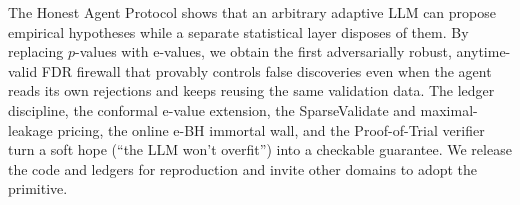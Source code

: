 \documentclass[sigconf]{acmart}
\theoremstyle{plain}
\begin{document}
The Honest Agent Protocol shows that an arbitrary adaptive LLM can propose
empirical hypotheses while a separate statistical layer disposes of them. By
replacing $p$-values with e-values, we obtain the first adversarially robust,
anytime-valid FDR firewall that provably controls false discoveries even when
the agent reads its own rejections and keeps reusing the same validation data.
The ledger discipline, the conformal e-value extension, the SparseValidate and
maximal-leakage pricing, the online e-BH immortal wall, and the Proof-of-Trial
verifier turn a soft hope (``the LLM won't overfit'') into a checkable
guarantee. We release the code and ledgers for reproduction and invite other
domains to adopt the primitive.



\end{document}
